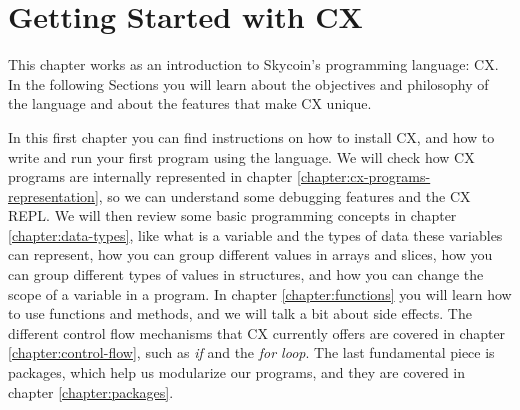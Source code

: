 \documentclass[11pt,fleqn,openany]{book} %
\begin{document}

\pagestyle{empty} %

\tableofcontents %


\pagestyle{fancy} %



\chapter{Getting Started with CX}
\label{chapter:getting-started-with-cx}

%

This chapter works as an introduction to Skycoin's programming language: CX. In the following Sections you will learn about the objectives and philosophy of the language and about the features that make CX unique.

In this first chapter you can find instructions on how to install CX, and how to write and run your first program using the language. We will check how CX programs are internally represented in chapter \ref{chapter:cx-programs-representation}, so we can understand some debugging features and the CX REPL. We will then review some basic programming concepts in chapter \ref{chapter:data-types}, like what is a variable and the types of data these variables can represent, how you can group different values in arrays and slices, how you can group different types of values in structures, and how you can change the scope of a variable in a program. In chapter \ref{chapter:functions} you will learn how to use functions and methods, and we will talk a bit about side effects. The different control flow mechanisms that CX currently offers are covered in chapter \ref{chapter:control-flow}, such as \textit{if} and the \textit{for loop}. The last fundamental piece is packages, which help us modularize our programs, and they are covered in chapter \ref{chapter:packages}.
\end{document}
